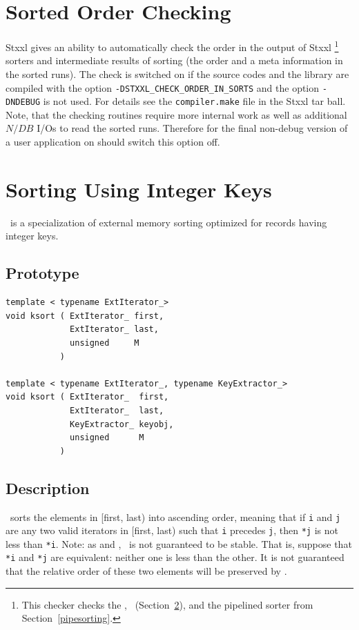 \documentclass[twoside]{book}
\newcommand{\stxxl}{{\sc Stxxl} }
\begin{document}
\section{Sorted Order Checking}
\stxxl gives an ability to automatically check the order in the output
of \stxxl \footnote{This checker checks the \xsort, \xksort\
(Section~\ref{ksortsection}), and 
the pipelined sorter from Section~\ref{pipesorting}.}
sorters and intermediate results of sorting (the order and a meta
information in the sorted runs). The check is switched on if the
source codes and the library are compiled with the option
\texttt{-DSTXXL\_CHECK\_ORDER\_IN\_SORTS} and the option
\texttt{-DNDEBUG} is not used. For details see the
\texttt{compiler.make} file in the \stxxl tar ball. Note, that the
checking routines require more internal work as well as additional $N/DB$
I/Os to read the sorted runs. Therefore for the final non-debug
version of a user application on should switch this option off.


\section{Sorting Using Integer Keys}
\label{ksortsection}
\xksort\ is a specialization of external memory sorting optimized for
records having integer keys.

\subsection*{Prototype}
\begin{lstlisting}
template < typename ExtIterator_>
void ksort ( ExtIterator_ first,
             ExtIterator_ last,
             unsigned     M
           )

template < typename ExtIterator_, typename KeyExtractor_>
void ksort ( ExtIterator_  first,
             ExtIterator_  last,
             KeyExtractor_ keyobj,
             unsigned      M
           )  
\end{lstlisting}

\subsection*{Description}
\xksort\ sorts the elements in [first, last) into ascending order,
meaning 
that if \texttt{i} and \texttt{j} are any two valid iterators in
[first, last) such that 
\texttt{i} precedes \texttt{j}, then \texttt{*j} is not less than
\texttt{*i}. Note: as \stdsort and \xsort, 
\xksort\ is not guaranteed to be stable. That is, suppose that
\texttt{*i} and \texttt{*j} are 
equivalent: neither one is less than the other. It is not guaranteed
that the relative order of these two elements will be preserved by
\xksort. 
\end{document}
